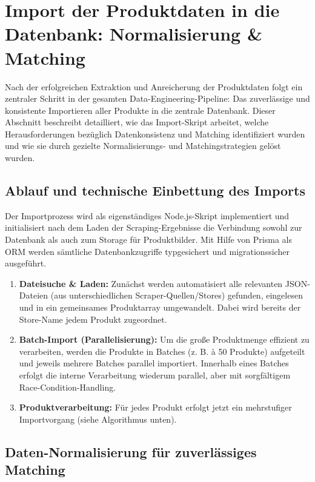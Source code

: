 \section{Import der Produktdaten in die Datenbank: Normalisierung \& Matching}

Nach der erfolgreichen Extraktion und Anreicherung der Produktdaten folgt ein zentraler Schritt in der gesamten Data-Engineering-Pipeline: Das zuverlässige und konsistente Importieren aller Produkte in die zentrale Datenbank. Dieser Abschnitt beschreibt detailliert, wie das Import-Skript arbeitet, welche Herausforderungen bezüglich Datenkonsistenz und Matching identifiziert wurden und wie sie durch gezielte Normalisierungs- und Matchingstrategien gelöst wurden.

\subsection{Ablauf und technische Einbettung des Imports}

Der Importprozess wird als eigenständiges Node.js-Skript implementiert und initialisiert nach dem Laden der Scraping-Ergebnisse die Verbindung sowohl zur Datenbank als auch zum Storage für Produktbilder. Mit Hilfe von Prisma als ORM werden sämtliche Datenbankzugriffe typgesichert und migrationssicher ausgeführt.

\begin{enumerate}
    \item \textbf{Dateisuche \& Laden:} Zunächst werden automatisiert alle relevanten JSON-Dateien (aus unterschiedlichen Scraper-Quellen/Stores) gefunden, eingelesen und in ein gemeinsames Produktarray umgewandelt. Dabei wird bereits der Store-Name jedem Produkt zugeordnet.
    \item \textbf{Batch-Import (Parallelisierung):} Um die große Produktmenge effizient zu verarbeiten, werden die Produkte in Batches (z. B. à 50 Produkte) aufgeteilt und jeweils mehrere Batches parallel importiert. Innerhalb eines Batches erfolgt die interne Verarbeitung wiederum parallel, aber mit sorgfältigem Race-Condition-Handling.
    \item \textbf{Produktverarbeitung:} Für jedes Produkt erfolgt jetzt ein mehrstufiger Importvorgang (siehe Algorithmus unten).
\end{enumerate}

\subsection{Daten-Normalisierung für zuverlässiges Matching}

